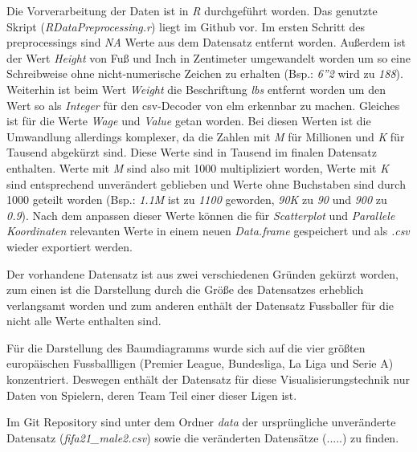 \documentclass[usegeometry=true]{scrartcl}
\begin{document}
Die Vorverarbeitung der Daten ist in \textit{R} durchgeführt worden. Das genutzte Skript (\textit{RDataPreprocessing.r}) liegt im Github vor.
Im ersten Schritt des preprocessings sind \textit{NA} Werte aus dem Datensatz entfernt worden.
Außerdem ist der Wert \textit{Height} von Fuß und Inch in Zentimeter umgewandelt worden um so eine Schreibweise ohne nicht-numerische Zeichen zu erhalten (Bsp.: \textit{6''2} wird zu \textit{188}). Weiterhin ist beim Wert \textit{Weight} die Beschriftung \textit{lbs} entfernt worden um den Wert so als \textit{Integer} für den csv-Decoder von elm erkennbar zu machen.
Gleiches ist für die Werte \textit{Wage} und \textit{Value} getan worden. Bei diesen Werten ist die Umwandlung allerdings komplexer, da die Zahlen mit \textit{M} für Millionen und \textit{K} für Tausend abgekürzt sind.
Diese Werte sind in Tausend im finalen Datensatz enthalten. Werte mit \textit{M} sind also mit 1000 multipliziert worden, Werte mit \textit{K} sind entsprechend unverändert geblieben und Werte ohne Buchstaben sind durch 1000 geteilt worden (Bsp.: \textit{1.1M} ist zu \textit{1100} geworden, \textit{90K} zu \textit{90} und \textit{900} zu \textit{0.9}).
Nach dem anpassen dieser Werte können die für \textit{Scatterplot} und \textit{Parallele Koordinaten} relevanten Werte in einem neuen \textit{Data.frame} gespeichert und als \textit{.csv} wieder exportiert werden.  


Der vorhandene Datensatz ist aus zwei verschiedenen Gründen gekürzt worden, zum einen ist die Darstellung durch die Größe des Datensatzes erheblich verlangsamt worden und zum anderen enthält der Datensatz Fussballer für die nicht alle Werte enthalten sind.

Für die Darstellung des Baumdiagramms wurde sich auf die vier größten europäischen Fussballligen (Premier League, Bundesliga, La Liga und Serie A) konzentriert. Deswegen enthält der Datensatz für diese Visualisierungstechnik nur Daten von Spielern, deren Team Teil einer dieser Ligen ist.

Im Git Repository sind unter dem Ordner \textit{data} der ursprüngliche unveränderte Datensatz (\textit{fifa21\_male2.csv}) sowie die veränderten Datensätze (.....) zu finden.
\end{document}
